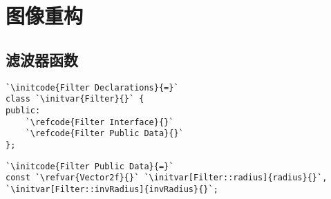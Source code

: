 \section{图像重构}\label{sec:图像重构}

\subsection{滤波器函数}\label{sub:滤波器函数}

\begin{lstlisting}
`\initcode{Filter Declarations}{=}`
class `\initvar{Filter}{}` {
public:
    `\refcode{Filter Interface}{}`
    `\refcode{Filter Public Data}{}`
};
\end{lstlisting}

\begin{lstlisting}
`\initcode{Filter Public Data}{=}`
const `\refvar{Vector2f}{}` `\initvar[Filter::radius]{radius}{}`, `\initvar[Filter::invRadius]{invRadius}{}`;
\end{lstlisting}
